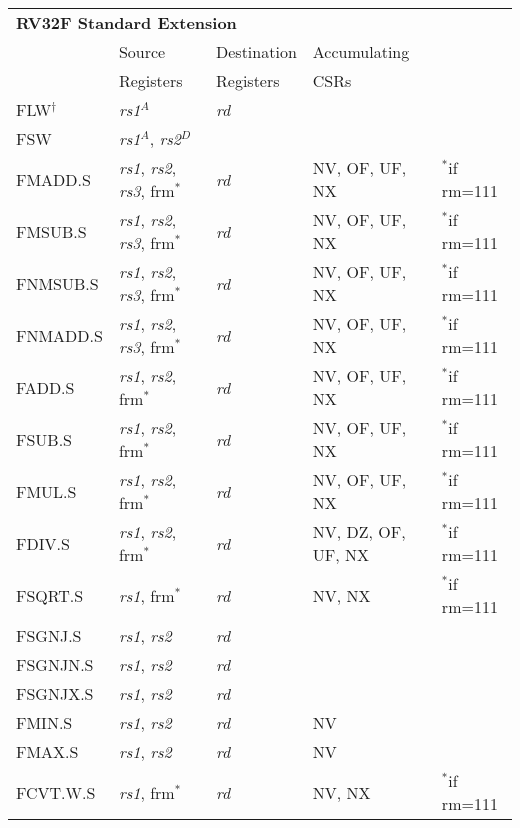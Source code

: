 \begin{tabular}{p{3cm}|p{25mm}|p{3cm}|p{4cm}|p{4cm}}
  \multicolumn{4}{l}{\bf RV32F Standard Extension} \\
  \cline{2-4}
   & Source    & Destination & Accumulating \\
   & Registers & Registers   & CSRs \\
  \cline{2-4}
   FLW$^\dagger$ & {\em rs1}$^A$ & {\em rd} & & \\
   \cline{2-4}
   FSW & {\em rs1}$^A$, {\em rs2}$^D$ &  &   & \\
   \cline{2-4}
   FMADD.S & {\em rs1}, {\em rs2},  {\em rs3}, frm$^*$ & {\em rd} & NV, OF, UF, NX & $^*$if rm=111 \\
   \cline{2-4}
   FMSUB.S & {\em rs1}, {\em rs2},  {\em rs3}, frm$^*$ & {\em rd} & NV, OF, UF, NX & $^*$if rm=111  \\
   \cline{2-4}
   FNMSUB.S & {\em rs1}, {\em rs2},  {\em rs3}, frm$^*$ & {\em rd} & NV, OF, UF, NX & $^*$if rm=111  \\
   \cline{2-4}
   FNMADD.S & {\em rs1}, {\em rs2},  {\em rs3}, frm$^*$ & {\em rd} & NV, OF, UF, NX & $^*$if rm=111  \\
   \cline{2-4}
   FADD.S & {\em rs1}, {\em rs2}, frm$^*$ & {\em rd} & NV, OF, UF, NX & $^*$if rm=111  \\
   \cline{2-4}
   FSUB.S & {\em rs1}, {\em rs2}, frm$^*$ & {\em rd} & NV, OF, UF, NX & $^*$if rm=111  \\
   \cline{2-4}
   FMUL.S & {\em rs1}, {\em rs2}, frm$^*$ & {\em rd} & NV, OF, UF, NX & $^*$if rm=111  \\
   \cline{2-4}
   FDIV.S & {\em rs1}, {\em rs2}, frm$^*$ & {\em rd} & NV, DZ, OF, UF, NX & $^*$if rm=111  \\
   \cline{2-4}
   FSQRT.S & {\em rs1}, frm$^*$ & {\em rd} & NV, NX & $^*$if rm=111  \\
   \cline{2-4}
   FSGNJ.S & {\em rs1}, {\em rs2} & {\em rd} &   & \\
   \cline{2-4}
   FSGNJN.S & {\em rs1}, {\em rs2} & {\em rd} &   & \\
   \cline{2-4}
   FSGNJX.S & {\em rs1}, {\em rs2} & {\em rd} &   & \\
   \cline{2-4}
   FMIN.S & {\em rs1}, {\em rs2} & {\em rd} & NV &   \\
   \cline{2-4}
   FMAX.S & {\em rs1}, {\em rs2} & {\em rd} & NV &   \\
   \cline{2-4}
   FCVT.W.S & {\em rs1}, frm$^*$ & {\em rd} & NV, NX & $^*$if rm=111  \\

\end{tabular}

